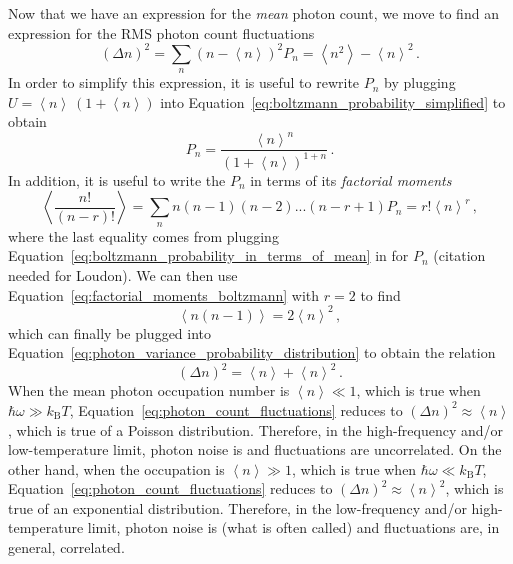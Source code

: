Now that we have an expression for the \textit{mean} photon count, we move to find an expression for the RMS photon count fluctuations
\begin{equation}
    \left( \Delta n \right)^{2} = \sum_{n} \left(n - \left< n \right> \right)^{2} P_{n} = \left< n ^{2} \right> - \left< n \right>^{2} \, .
    \label{eq:photon_variance_probability_distribution}
\end{equation}
In order to simplify this expression, it is useful to rewrite $P_{n}$ by plugging $U = \left< n \right> \ (1 + \left< n \right>)$ into Equation~\ref{eq:boltzmann_probability_simplified} to obtain
\begin{equation}
    P_{n} = \frac{\left< n \right>^{n}}{\left( 1 + \left< n \right> \right)^{1 + n}} \, .
    \label{eq:boltzmann_probability_in_terms_of_mean}
\end{equation}
In addition, it is useful to write the $P_{n}$ in terms of its \textit{factorial moments}
\begin{equation}
    \left< \frac{n !}{\left( n - r \right) !} \right> = \sum_{n} n \left( n - 1 \right) \left( n - 2 \right) ... \left( n - r + 1 \right) P_{n} = r ! \left< n \right>^{r} \, ,
    \label{eq:factorial_moments_boltzmann}
\end{equation}
where the last equality comes from plugging Equation~\ref{eq:boltzmann_probability_in_terms_of_mean} in for $P_{n}$ (citation needed for Loudon). We can then use Equation~\ref{eq:factorial_moments_boltzmann} with $r = 2$ to find
\begin{equation}
    \left< n (n - 1) \right> = 2 \left< n \right>^{2} \, ,
    \label{eq:factorial_second_moment}
\end{equation}
which can finally be plugged into Equation~\ref{eq:photon_variance_probability_distribution} to obtain the relation
\begin{equation}
    \left( \Delta n \right)^{2} = \left< n \right> + \left< n \right>^{2} \, .
    \label{eq:photon_count_fluctuations}
\end{equation}
When the mean photon occupation number is $\left< n \right> \ll 1$, which is true when $\hbar \omega \gg k_{\mathrm{B}} T$, Equation~\ref{eq:photon_count_fluctuations} reduces to $\left( \Delta n \right)^{2} \approx \left< n \right>$, which is true of a Poisson distribution. Therefore, in the high-frequency and/or low-temperature limit, photon noise is  and fluctuations are uncorrelated. On the other hand, when the occupation is $\left< n \right> \gg 1$, which is true when $\hbar \omega \ll k_{\mathrm{B}} T$, Equation~\ref{eq:photon_count_fluctuations} reduces to $\left( \Delta n \right)^{2} \approx \left< n \right>^{2}$, which is true of an exponential distribution. Therefore, in the low-frequency and/or high-temperature limit, photon noise is (what is often called)  and fluctuations are, in general, correlated.

